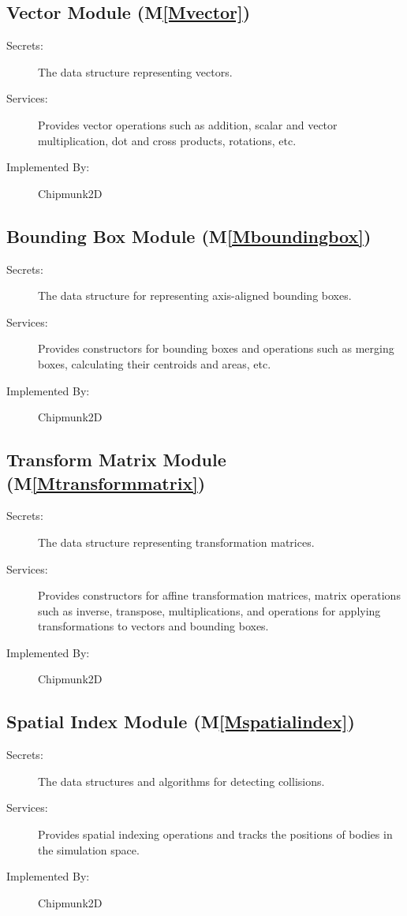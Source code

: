 \documentclass[12pt]{article}
\begin{document}
\subsection{Vector Module (M\ref{Mvector})}
\label{Sec:VM()}
\begin{description}
\item[Secrets:]The data structure representing vectors.
\item[Services:]Provides vector operations such as addition, scalar and vector multiplication, dot and cross products, rotations, etc.
\item[Implemented By:]Chipmunk2D
\end{description}
\subsection{Bounding Box Module (M\ref{Mboundingbox})}
\label{Sec:BBM()}
\begin{description}
\item[Secrets:]The data structure for representing axis-aligned bounding boxes.
\item[Services:]Provides constructors for bounding boxes and operations such as merging boxes, calculating their centroids and areas, etc.
\item[Implemented By:]Chipmunk2D
\end{description}
\subsection{Transform Matrix Module (M\ref{Mtransformmatrix})}
\label{Sec:TMM()}
\begin{description}
\item[Secrets:]The data structure representing transformation matrices.
\item[Services:]Provides constructors for affine transformation matrices, matrix operations such as inverse, transpose, multiplications, and operations for applying transformations to vectors and bounding boxes.
\item[Implemented By:]Chipmunk2D
\end{description}
\subsection{Spatial Index Module (M\ref{Mspatialindex})}
\label{Sec:SIM()}
\begin{description}
\item[Secrets:]The data structures and algorithms for detecting collisions.
\item[Services:]Provides spatial indexing operations and tracks the positions of bodies in the simulation space.
\item[Implemented By:]Chipmunk2D
\end{description}
\end{document}
